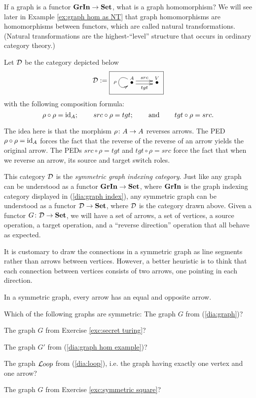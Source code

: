 If a graph is a functor ${\bf GrIn}\rightarrow{\bf Set}$, what is a graph homomorphism? We will see later in Example \ref{ex:graph hom as NT} that graph homomorphisms are homomorphisms between functors, which are called natural transformations. (Natural transformations are the highest-“level” structure that occurs in ordinary category theory.)

\begin{example}

Let $\mathcal{D}$ be the category depicted below
\begin{align}\label{dia:symmetric graph index}
\mcD:=\fbox{\xymatrix{\LMO{A}\ar@(lu,ld)[]_\rho\ar@<.5ex>[r]^{src}\ar@<-.5ex>[r]_{tgt}&\LMO{V}}}
\end{align}
with the following composition formula: 
$$\rho\circ\rho=\textnormal{id}_A;\hspace{.3in} src\circ\rho=tgt;\hspace{.3in}\textnormal{and}\hspace{.3in} tgt\circ\rho=src.$$

The idea here is that the morphism $\rho\colon A\rightarrow A$ reverses arrows. The PED $\rho\circ\rho=\textnormal{id}_A$ forces the fact that the reverse of the reverse of an arrow yields the original arrow. The PEDs $src\circ\rho=tgt$ and $tgt\circ\rho=src$ force the fact that when we reverse an arrow, its source and target switch roles. 

This category $\mathcal{D}$ is the {\em symmetric graph indexing category}. Just like any graph can be understood as a functor ${\bf GrIn}\rightarrow{\bf Set}$, where ${\bf GrIn}$ is the graph indexing category displayed in (\ref{dia:graph index}), any symmetric graph can be understood as a functor $\mathcal{D}\rightarrow{\bf Set}$, where $\mathcal{D}$ is the category drawn above. Given a functor $G\colon\mathcal{D}\rightarrow{\bf Set}$, we will have a set of arrows, a set of vertices, a source operation, a target operation, and a “reverse direction” operation that all behave as expected.

It is customary to draw the connections in a symmetric graph as line segments rather than arrows between vertices. However, a better heuristic is to think that each connection between vertices consists of two arrows, one pointing in each direction. 

\begin{slogan}
In a symmetric graph, every arrow has an equal and opposite arrow.
\end{slogan}

\end{example}

\begin{exercise}
Which of the following graphs are symmetric:
\sexc The graph $G$ from (\ref{dia:graph})?
\item The graph $G$ from Exercise \ref{exc:secret turing}?
\item The graph $G'$ from (\ref{dia:graph hom example})?
\item The graph ${\mathcal{L} oop}$ from (\ref{dia:loop}), i.e. the graph having exactly one vertex and one arrow?
\item The graph $G$ from Exercise \ref{exc:symmetric square}?
\endsexc
\end{exercise}

